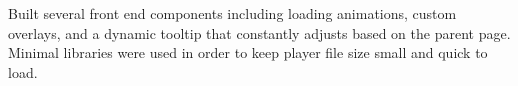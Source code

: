 \documentclass[]{deedy-resume-openfont}
\begin{document}
\begin{minipage}[t]{0.66\textwidth}
Built several front end components including loading animations, custom overlays, and a dynamic tooltip that constantly adjusts based on the parent page. Minimal libraries were used in order to keep player file size small and quick to load.
\sectionsep

\end{minipage} 
\end{document}
